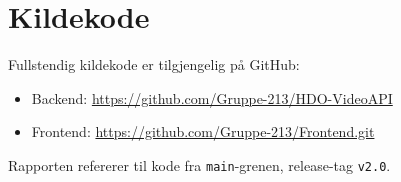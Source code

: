 \chapter{Kildekode}
\label{app:kildekode}

Fullstendig kildekode er tilgjengelig på GitHub:

\begin{itemize}
    \item Backend: \url{https://github.com/Gruppe-213/HDO-VideoAPI}
    \item Frontend: \url{https://github.com/Gruppe-213/Frontend.git}
\end{itemize}

Rapporten refererer til kode fra \texttt{main}-grenen,
release-tag \texttt{v2.0}.